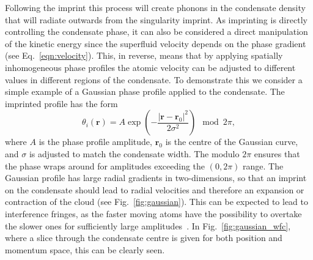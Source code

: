 Following the imprint this process will create phonons in the condensate density that will radiate outwards from the singularity imprint. As imprinting is directly controlling the condensate phase, it can also be considered a direct manipulation of the kinetic energy since the superfluid velocity depends on the phase gradient (see Eq.~\eqref{eqn:velocity}). This, in reverse, means that by applying spatially inhomogeneous phase profiles the atomic velocity can be adjusted to different values in different regions of the condensate. To demonstrate this we consider a simple example of a Gaussian phase profile applied to the condensate. The imprinted profile has the form
\begin{equation}
    \theta_{i}(\mathbf{r}) = A\exp\left( -\frac{ |\mathbf{r}-\mathbf{r}_0|^2 }{2\sigma^2 } \right) \mod 2\pi,
\end{equation}
where $A$ is the phase profile amplitude, $\mathbf{r}_0$ is the centre of the Gaussian curve, and $\sigma$ is adjusted to match the condensate width. The modulo $2\pi$ ensures that the phase wraps around for amplitudes exceeding the $(0,2\pi)$ range. The Gaussian profile has large radial gradients in two-dimensions, so that an imprint on the condensate should lead to radial velocities and therefore an expansion or contraction of the cloud (see Fig.~\ref{fig:gaussian}). This can be expected to lead to interference fringes, as the faster moving atoms have the possibility to overtake the slower ones for sufficiently large amplitudes~\cite{BEC:Busch_pra_2002}. In Fig.~\ref{fig:gaussian_wfc}, where a slice through the condensate centre is given for both position and momentum space, this can be clearly seen.

